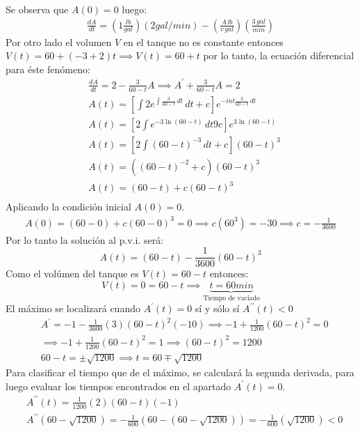 Se observa que $A(0)=0$ luego: 
\begin{align*}
    \frac{dA}{dt}=\left(1\frac{lb}{gal}\right)\left(2gal/min\right)-\left(\frac{A\, lb}{v\, gal}\right)\left(\frac{3\, gal}{min}\right)
\end{align*}
Por otro lado el volumen $V$ en el tanque no es constante entonces $V(t)=60+(-3+2)t\implies V(t)=60+t$
por lo tanto, la ecuación diferencial para éste fenómeno:
\begin{align*}
    &\frac{dA}{dt}=2-\frac{3}{60-t}A\implies A^{\prime}+\frac{3}{60-t}A=2\\
    &A(t)=\left[\int 2e^{\int \frac{3}{60-t}\, dt}\, dt+c\right]e^{-int \frac{3}{60-t}\, dt}\\
    &A(t)=\left[2\int e^{-3\ln{(60-t)}}\, dt9c\right]e^{3\ln{(60-t)}}\\ 
    &A(t)=\left[2\int \left(60-t\right)^{-3}\, dt+c\right]\left(60-t\right)^3\\
    &A(t)=\left(\left(60-t\right)^{-2}+c\right)\left(60-t\right)^3\\
    &A(t)=\left(60-t\right)+c\left(60-t\right)^3\\
\end{align*}
Aplicando la condición inicial $A(0)=0$.
\begin{align*}
    A(0)=(60-0)+c(60-0)^3=0\implies c\left(60^3\right)=-30\implies c=-\frac{1}{3600}
\end{align*}
Por lo tanto la solución al p.v.i. será:
\begin{equation*}
    A(t)=(60-t)-\frac{1}{3600}(60-t)^3
\end{equation*}
Como el volúmen del tanque es $V(t)=60-t$ entonces: 
\begin{equation*}
    V(t)=0=60-t\implies \underbrace{t=60min}_{\text{Tiempo de vaciado}}
\end{equation*}
El máximo se localizará cuando $A^{\prime}(t)=0$ sí y sólo sí $A^{\prime\prime}(t)<0$
\begin{align*}
    &A^{\prime}=-1-\frac{1}{3600}(3)(60-t)^2(-10)\implies -1+\frac{1}{1200}\left(60-t\right)^2=0\\
    &\implies -1+\frac{1}{1200}\left(60-t\right)^2=1\implies \left(60-t\right)^2=1200\\
    &60-t=\pm\sqrt{1200}\implies t=60\mp \sqrt{1200}
\end{align*}
Para clasificar el tiempo que de el máximo, se calculará la segunda derivada, para luego evaluar los tiempos encontrados en el apartado $A^{\prime}(t)=0$.
\begin{align*}
    &A^{\prime\prime}(t)=\frac{1}{1200}(2)(60-t)(-1)\\
    &A^{\prime\prime}\left(60-\sqrt{1200}\right)=-\frac{1}{600}\left(60-\left(60-\sqrt{1200}\right)\right)=-\frac{1}{600}\left(\sqrt{1200}\right)<0
\end{align*}
